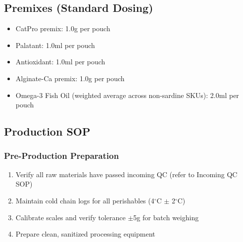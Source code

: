 \vspace{1em}

\subsection*{Premixes (Standard Dosing)}
\begin{itemize}
\item CatPro premix: 1.0g per pouch
\item Palatant: 1.0ml per pouch
\item Antioxidant: 1.0ml per pouch
\item Alginate-Ca premix: 1.0g per pouch
\item Omega-3 Fish Oil (weighted average across non-sardine SKUs): 2.0ml per pouch
\end{itemize}

\subsection*{Production SOP}

\subsubsection*{Pre-Production Preparation}
\begin{enumerate}
\item Verify all raw materials have passed incoming QC (refer to Incoming QC SOP)
\item Maintain cold chain logs for all perishables (4$^\circ$C $\pm$ 2$^\circ$C)
\item Calibrate scales and verify tolerance $\pm$5g for batch weighing
\item Prepare clean, sanitized processing equipment
\end{enumerate}

